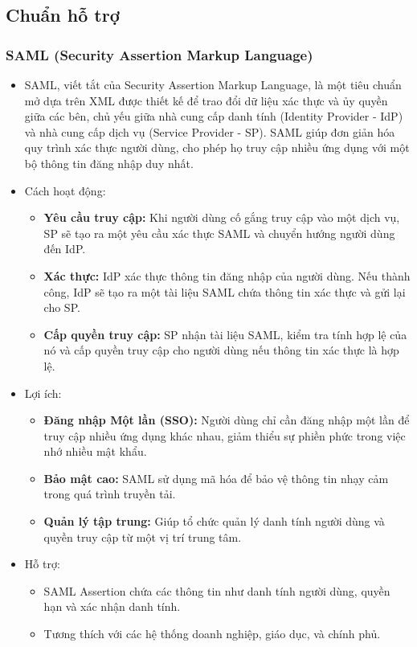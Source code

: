 \newpage
\subsection{Chuẩn hỗ trợ}
\subsubsection{SAML (Security Assertion Markup Language)}
\begin{itemize}
    \item SAML, viết tắt của Security Assertion Markup Language, là một tiêu chuẩn mở dựa trên XML được thiết kế để trao đổi dữ liệu xác thực và ủy quyền giữa các bên, chủ yếu giữa nhà cung cấp danh tính (Identity Provider - IdP) và nhà cung cấp dịch vụ (Service Provider - SP). SAML giúp đơn giản hóa quy trình xác thực người dùng, cho phép họ truy cập nhiều ứng dụng với một bộ thông tin đăng nhập duy nhất.

    \item Cách hoạt động:
    \begin{itemize}
        \item \textbf{Yêu cầu truy cập:} Khi người dùng cố gắng truy cập vào một dịch vụ, SP sẽ tạo ra một yêu cầu xác thực SAML và chuyển hướng người dùng đến IdP.

        \item \textbf{Xác thực:} IdP xác thực thông tin đăng nhập của người dùng. Nếu thành công, IdP sẽ tạo ra một tài liệu SAML chứa thông tin xác thực và gửi lại cho SP.

        \item \textbf{Cấp quyền truy cập:} SP nhận tài liệu SAML, kiểm tra tính hợp lệ của nó và cấp quyền truy cập cho người dùng nếu thông tin xác thực là hợp lệ.

    \end{itemize}
    \item Lợi ích:
    \begin{itemize}
        \item \textbf{Đăng nhập Một lần (SSO):} Người dùng chỉ cần đăng nhập một lần để truy cập nhiều ứng dụng khác nhau, giảm thiểu sự phiền phức trong việc nhớ nhiều mật khẩu.

        \item \textbf{Bảo mật cao:} SAML sử dụng mã hóa để bảo vệ thông tin nhạy cảm trong quá trình truyền tải.

        \item \textbf{Quản lý tập trung:} Giúp tổ chức quản lý danh tính người dùng và quyền truy cập từ một vị trí trung tâm.
    \end{itemize}
    \item Hỗ trợ:
    \begin{itemize}
        \item SAML Assertion chứa các thông tin như danh tính người dùng, quyền hạn và xác nhận danh tính.
        \item Tương thích với các hệ thống doanh nghiệp, giáo dục, và chính phủ.


\end{itemize}
\end{itemize}
